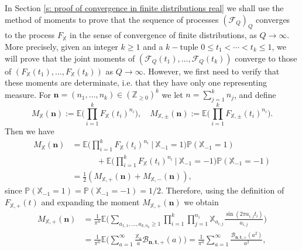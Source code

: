\documentclass[10pt]{amsart}
\theoremstyle{plain}
\theoremstyle{definition}
\newcommand{\X}{\mathbb{X}}
\newcommand{\pr}{\mathbb{P}}
\begin{document}
\label{s: the limiting moment}
In Section \ref{s: proof of convergence in finite distributions real} we shall use the method of moments to prove that the sequence of processes $(\mathcal{F}_{Q})_Q$ converges to the process $F_{\X}$ in the sense of convergence of finite distributions, as $Q\to \infty$. More precisely, given an integer $k \geq 1$ and a $k-$tuple $0 \leq t_1 < \cdots < t_k \leq 1$, we will prove that the joint moments of $(\mathcal{F}_{Q}(t_1), \dots, \mathcal{F}_{Q}(t_k)) $
converge to those of $(F_{\X}(t_1), \dots, F_{\X}(t_k))$ as $Q\to \infty$. However, we first need to verify that these moments are determinate, i.e. that they have only one representing measure. For $\boldsymbol{n}=(n_1, \dots, n_k)\in (\mathbb{Z}_{\geq 0})^k$ we let $n= \sum_{j=1}^k n_j$, and define
\begin{equation}\label{eq: limiting moment}
M_{\X}(\boldsymbol{n}):= \mathbb{E}\biggl( \prod_{i = 1}^k F_{\X}(t_i)^{n_i} \biggr), \quad
M_{\X,\pm}(\boldsymbol{n}):= \mathbb{E}\biggl( \prod_{i = 1}^k F_{\X,\pm}(t_i)^{n_i} \biggr).
\end{equation}
Then we have
\begin{equation}\label{eq: MomentRandomPM}
\begin{aligned}
M_{\X}(\boldsymbol{n})&= \mathbb{E}\biggl( \prod_{i = 1}^k F_{\X}(t_i)^{n_i} \ \Big| \ \X_{-1}=1\biggr) \pr(\X_{-1}=1) \\
& \quad \quad \quad +\mathbb{E}\biggl( \prod_{i = 1}^k F_{\X}(t_i)^{n_i} \ \Big| \ \X_{-1}=-1\biggr) \pr(\X_{-1}=-1)\\
& =\frac{1}{2}\left(M_{\X,+}(\boldsymbol{n})+ M_{\X,-}(\boldsymbol{n})\right),
\end{aligned}
\end{equation}
since $\pr(\X_{-1}=1)= \pr(\X_{-1}=-1)=1/2.$
Therefore, using the definition of $F_{\X,+}(t)$ and expanding the moment $M_{\X,+}(\boldsymbol{n})$ we obtain
\begin{equation}\label{eq: FormulaMomentRandom+}
\begin{aligned}
M_{\X,+}(\boldsymbol{n}) &= \frac{1}{\pi^{n}} \mathbb{E} \biggl( \sum_{a_{1,1}, \dots, a_{k,n_k} \geq 1} \prod_{i = 1}^k \prod_{j = 1}^{n_i} \X_{a_{i,j}} \frac{\sin(2 \pi a_{i,j}t_i)}{a_{i,j}}\biggr)\\ & = \frac{1}{\pi^{n}} \mathbb{E} \biggl(\sum_{a=1}^{\infty} \frac{\X_a}{a}\mathcal{B}_{\boldsymbol{n},\mathbf{t}, +}(a)\biggr)= \frac{1}{\pi^{n}} \sum_{a=1}^{\infty} \frac{\mathcal{B}_{\boldsymbol{n},\mathbf{t}, +}(a^2)}{a^2},
\end{aligned}
\end{equation}
\end{document}
